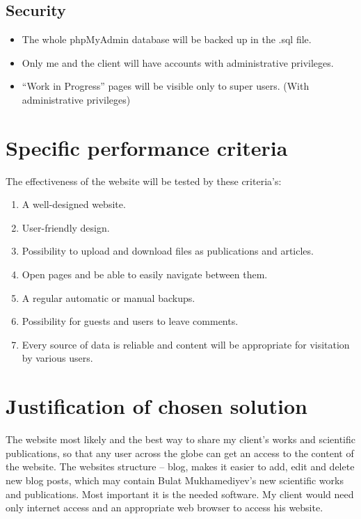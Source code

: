 \documentclass[a4paper, 12pt]{article}
\begin{document}
\subsection*{Security}

\begin{itemize}
    \item The whole phpMyAdmin database will be backed up in the .sql file.
    \item Only me and the client will have accounts with administrative privileges.
    \item “Work in Progress” pages will be visible only to super users. (With administrative privileges)
\end{itemize}

\section*{Specific performance criteria}

The effectiveness of the website will be tested by these criteria's:

\begin{enumerate}
    \item A well-designed website.
    \item User-friendly design.
    \item Possibility to upload and download files as publications and articles.
    \item Open pages and be able to easily navigate between them.
    \item A regular automatic or manual backups.
    \item Possibility for guests and users to leave comments.
    \item Every source of data is reliable and content will be appropriate for visitation by various users.
\end{enumerate}

\section*{Justification of chosen solution}

The website most likely and the best way to share my client's works and scientific publications, so that any user across the globe can get an access to the content of the website. The websites structure – blog, makes it easier to add, edit and delete new blog posts, which may contain Bulat Mukhamediyev’s new scientific works and publications. Most important it is the needed software. My client would need only internet access and an appropriate web browser to access his website.\\
\end{document}
